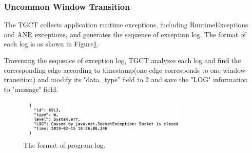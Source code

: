 
\subsubsection{Uncommon Window Transition}
The TGCT collects application runtime exceptions, including RuntimeExceptions and ANR exceptions, and generates the sequence of exception log. The format of each log is as shown in Figure\ref{fig:foramt2}.

Traversing the sequence of exception log, TGCT analyzes each log and find the corresponding edge according to timestamp(one edge corresponds to one window transition) and modify its "data\_type" field to 2 and save the "LOG" information to "message" field.

\begin{figure}[htbp]
\centering
\centerline{\includegraphics[width=\columnwidth,height=2cm]{fig/5.png}}
\caption{The format of program log.}
\label{fig:foramt2}
\end{figure}

